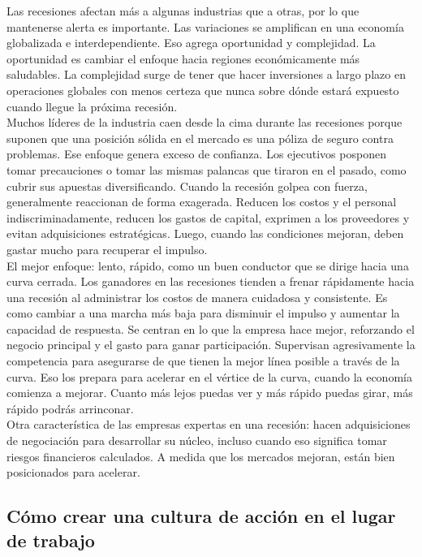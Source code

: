 \documentclass[10pt]{book}
\begin{document}
Las recesiones afectan más a algunas industrias que a otras, por lo que mantenerse alerta es importante. Las variaciones se amplifican en una economía globalizada e interdependiente. Eso agrega oportunidad y complejidad. La oportunidad es cambiar el enfoque hacia regiones económicamente más saludables. La complejidad surge de tener que hacer inversiones a largo plazo en operaciones globales con menos certeza que nunca sobre dónde estará expuesto cuando llegue la próxima recesión.\\
Muchos líderes de la industria caen desde la cima durante las recesiones porque suponen que una posición sólida en el mercado es una póliza de seguro contra problemas. Ese enfoque genera exceso de confianza. Los ejecutivos posponen tomar precauciones o tomar las mismas palancas que tiraron en el pasado, como cubrir sus apuestas diversificando. Cuando la recesión golpea con fuerza, generalmente reaccionan de forma exagerada. Reducen los costos y el personal indiscriminadamente, reducen los gastos de capital, exprimen a los proveedores y evitan adquisiciones estratégicas. Luego, cuando las condiciones mejoran, deben gastar mucho para recuperar el impulso.\\
El mejor enfoque: lento, rápido, como un buen conductor que se dirige hacia una curva cerrada. Los ganadores en las recesiones tienden a frenar rápidamente hacia una recesión al administrar los costos de manera cuidadosa y consistente. Es como cambiar a una marcha más baja para disminuir el impulso y aumentar la capacidad de respuesta. Se centran en lo que la empresa hace mejor, reforzando el negocio principal y el gasto para ganar participación. Supervisan agresivamente la competencia para asegurarse de que tienen la mejor línea posible a través de la curva. Eso los prepara para acelerar en el vértice de la curva, cuando la economía comienza a mejorar. Cuanto más lejos puedas ver y más rápido puedas girar, más rápido podrás arrinconar.\\
Otra característica de las empresas expertas en una recesión: hacen adquisiciones de negociación para desarrollar su núcleo, incluso cuando eso significa tomar riesgos financieros calculados. A medida que los mercados mejoran, están bien posicionados para acelerar.
\subsection{Cómo crear una cultura de acción en el lugar de trabajo}
\end{document}
